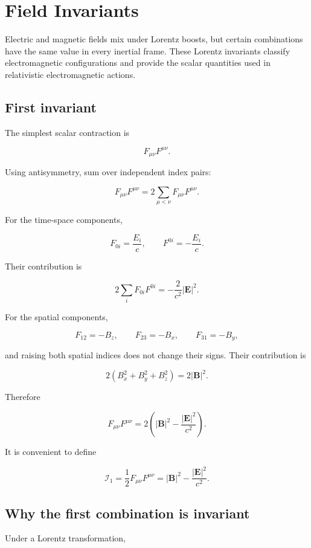 \section{Field Invariants}
\label{sec:electromagnetic_field_invariants}

Electric and magnetic fields mix under Lorentz boosts, but certain combinations have the same value in every inertial frame. These Lorentz invariants classify electromagnetic configurations and provide the scalar quantities used in relativistic electromagnetic actions.

\subsection{First invariant}

The simplest scalar contraction is

\[
F_{\mu\nu}F^{\mu\nu}.
\]

Using antisymmetry, sum over independent index pairs:

\[
F_{\mu\nu}F^{\mu\nu}
=
2
\sum_{\mu<\nu}
F_{\mu\nu}F^{\mu\nu}.
\]

For the time-space components,

\[
F_{0i}
=
\frac{E_i}{c},
\qquad
F^{0i}
=
-
\frac{E_i}{c}.
\]

Their contribution is

\[
2
\sum_i
F_{0i}F^{0i}
=
-
\frac{2}{c^2}
|\mathbf{E}|^2.
\]

For the spatial components,

\[
F_{12}=-B_z,
\qquad
F_{23}=-B_x,
\qquad
F_{31}=-B_y,
\]

and raising both spatial indices does not change their signs. Their contribution is

\[
2
\left(
B_x^2+B_y^2+B_z^2
\right)
=
2|\mathbf{B}|^2.
\]

Therefore

\[
\boxed{
F_{\mu\nu}F^{\mu\nu}
=
2
\left(
|\mathbf{B}|^2
-
\frac{|\mathbf{E}|^2}{c^2}
\right)
}.
\]

It is convenient to define

\[
\boxed{
\mathcal{I}_1
=
\frac{1}{2}
F_{\mu\nu}F^{\mu\nu}
=
|\mathbf{B}|^2
-
\frac{|\mathbf{E}|^2}{c^2}
}.
\]

\subsection{Why the first combination is invariant}

Under a Lorentz transformation,

